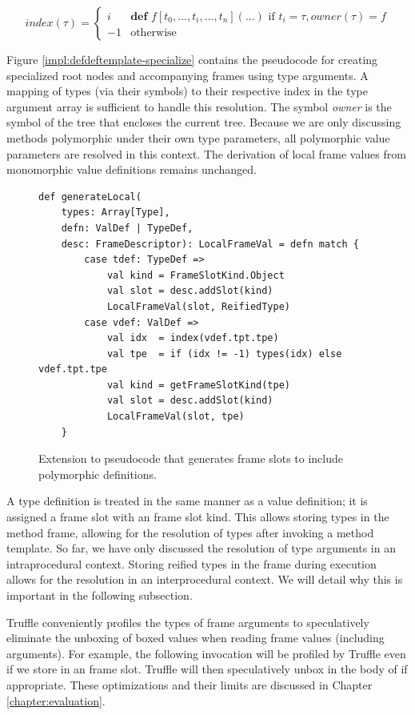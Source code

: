 $$
index(\tau) = 
\begin{cases}
	i  & \textbf{def } f[t_0, \ldots, t_i, \ldots, t_n](\ldots) \text{ if } t_i = \tau, owner(\tau)=f \\
	-1 & \text{otherwise}
\end{cases}
$$

Figure \ref{impl:defdeftemplate-specialize} contains the pseudocode for creating specialized root nodes and accompanying frames using type arguments.
A mapping of types (via their symbols) to their respective index in the type argument array is sufficient to handle this resolution.
The symbol \textit{owner} is the symbol of the tree that encloses the current tree.
Because we are only discussing methods polymorphic under their own type parameters, all polymorphic value parameters are resolved in this context.
The derivation of local frame values from monomorphic value definitions remains unchanged. 

\begin{figure}[!htb]
\begin{verbatim}
def generateLocal(
	types: Array[Type], 
	defn: ValDef | TypeDef, 
	desc: FrameDescriptor): LocalFrameVal = defn match {
		case tdef: TypeDef => 
			val kind = FrameSlotKind.Object
			val slot = desc.addSlot(kind)
			LocalFrameVal(slot, ReifiedType)
		case vdef: ValDef => 
			val idx  = index(vdef.tpt.tpe)
			val tpe  = if (idx != -1) types(idx) else vdef.tpt.tpe
			val kind = getFrameSlotKind(tpe)
			val slot = desc.addSlot(kind)
			LocalFrameVal(slot, tpe)
	}
\end{verbatim}
\caption{Extension to pseudocode that generates frame slots to include polymorphic definitions.}
\label{impl:gen-poly-locals}
\end{figure}

A type definition is treated in the same manner as a value definition; it is assigned a frame slot with an  frame slot kind.
This allows storing types in the method frame, allowing for the resolution of types after invoking a method template.
So far, we have only discussed the resolution of type arguments in an intraprocedural context.
Storing reified types in the frame during execution allows for the resolution in an interprocedural context.
We will detail why this is important in the following subsection.

Truffle conveniently profiles the types of frame arguments to speculatively eliminate the unboxing of boxed values when reading frame values (including arguments). 
For example, the following invocation  will be profiled by Truffle even if we store  in an  frame slot.
Truffle will then speculatively unbox  in the body of  if appropriate.
These optimizations and their limits are discussed in Chapter \ref{chapter:evaluation}.

